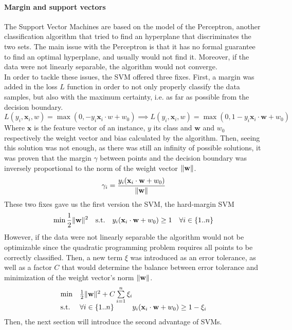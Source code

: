 \documentclass{article}
\DeclarePairedDelimiter{\norm}{\lVert}{\rVert}
\let\vec\mathbf
\theoremstyle{definition}
\begin{document}
\paragraph{Margin and support vectors}
The Support Vector Machines are based on the model of the Perceptron\cite{freund1999large}, another classification algorithm that tried to find an hyperplane that discriminates the two sets. The main issue with the Perceptron is that it has no formal guarantee to find an optimal hyperplane, and usually would not find it. Moreover, if the data were not linearly separable, the algorithm would not converge.\\
In order to tackle these issues, the SVM offered three fixes. First, a margin was added in the loss $L$ function in order to not only properly classify the data samples, but also with the maximum certainty, i.e. as far as possible from the decision boundary.
\begin{equation}
    L(y_i ,\vec{x}_i,w) = \max(0,-y_i \vec{x}_i \cdot w + w_{0}) \implies L(y_i ,\vec{x}_i,w) = \max(0,1-y_i \vec{x}_i\cdot \vec{w} + w_{0})
\end{equation}
Where $\vec{x}$ is the feature vector of an instance, $y$ its class and $\vec{w}$ and $w_{0}$ respectively the weight vector and bias calculated by the algorithm.
Then, seeing this solution was not enough, as there was still an infinity of possible solutions, it was proven that the margin $\gamma$ between points and the decision boundary was inversely proportional to the norm of the weight vector $\norm{\vec{w}}$.\\
\begin{equation}
\gamma_i = \frac{y_{i}(\vec{x}_{i} \cdot \vec{w} + w_{0})}{\norm{\vec{w}}}
\end{equation}
These two fixes gave us the first version the SVM, the hard-margin SVM\\ 
\begin{equation}
    \min \frac{1}{2}\norm{\vec{w}}^{2} \quad
\textup{s.t.}\quad y_{i}(\vec{x}_{i} \cdot \vec{w} + w_{0}) \geq 1 \quad \forall i \in \{1..n\}
\end{equation}
However, if the data were not linearly separable the algorithm would not be optimizable since the quadratic programming problem requires all points to be correctly classified. Then, a new term $\xi$ was introduced as an error tolerance, as well as a factor $C$ that would determine the balance between error tolerance and minimization of the weight vector's norm $\norm{\vec{w}}$.\\
\begin{equation}
\begin{array}{ll@{}ll}
\text{min}  & \frac{1}{2}\norm{\vec{w}}^{2}+C\sum\limits_{i=1}^{n}\xi_{i} &\\
\text{s.t.}& \forall i \in \{1..n\} & y_{i}(\vec{x}_{i} \cdot \vec{w} + w_{0}) \geq 1-\xi_{i}
\end{array}
\end{equation}
Then, the next section will introduce the second advantage of SVMs.
\end{document}
